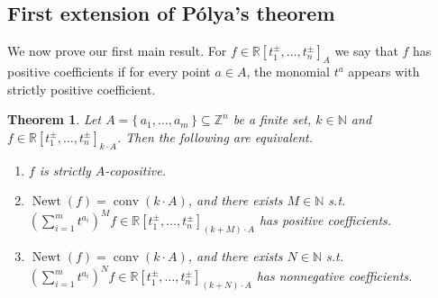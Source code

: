 \documentclass[a4paper,11pt]{amsart}
\newtheorem{theorem}{Theorem}[section]
\theoremstyle{definition}
\DeclareMathOperator{\conv}{conv}
\DeclareMathOperator{\Newt}{Newt}
\newcommand{\ZZ}{\mathbb{Z}}
\newcommand{\NN}{\mathbb{N}}
\newcommand{\RR}{\mathbb{R}}
\begin{document}
\subsection{First extension of Pólya's theorem}
We now prove our first main result. For $f\in \RR[t_1^\pm,\ldots,t_n^\pm]_A$ we say that $f$ has positive coefficients if for every point $a \in A$, the monomial $t^a$ appears with strictly positive coefficient.

\begin{theorem}
\label{Thm:SparsePolya}
Let $A = \{ \,a_1, \dots , a_m \,\} \subseteq \ZZ^n$ be a finite set, $k \in \NN$ and $f \in \mathbb{R}[t_1^{\pm}, \dots , t_n^{\pm}]_{k \cdot A}$. Then the following are equivalent.
\begin{enumerate}
    \item[(i)] $f$ is strictly $A$-copositive.
    \item[(ii)] $\Newt(f) = \conv(k \cdot A)$, and there exists $M \in \NN$ s.t. $(\sum_{i=1}^m t^{a_i})^M f\in \RR[t_1^\pm,\ldots,t_n^\pm]_{(k+M)\cdot A}$ has positive coefficients.
    \item[(iii)] $\Newt(f) = \conv(k \cdot A)$, and there exists $N \in \NN$ s.t. $(\sum_{i=1}^m t^{a_i})^N f\in \RR[t_1^\pm,\ldots,t_n^\pm]_{(k+N)\cdot A}$ has nonnegative coefficients.
\end{enumerate}
\end{theorem}
\end{document}
